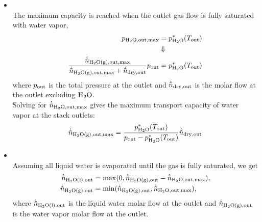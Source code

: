 \begin{itemize}
   \item {}\\
       The maximum capacity is reached when the outlet gas flow is fully saturated with water vapor, \ie
        \begin{align}
         p_{\mathrm{H_2O,out,max}}&=p_{\mathrm{H_2O}}^{\mathrm{\ast}}(T_{\mathrm{out}})\\
          &\Downarrow \quad \nonumber\\
         \frac{\dot{\tilde n}_{\mathrm{H_2O(g),out,max}}}{\dot{\tilde n}_{\mathrm{H_2O(g),out,max}}+\dot{\tilde n}_{\mathrm{dry,out}}} p_{\mathrm{out}}&=p_{\mathrm{H_2O}}^{\mathrm{\ast}}(T_{\mathrm{out}})         
        \end{align}
       where $p_{\mathrm{out}}$ is the total pressure at the outlet and $\dot{\tilde n}_{\mathrm{dry,out}}$ is the molar flow at the outlet excluding $\mathrm{H_2O}$.\\
       Solving for $\dot{\tilde n}_{\mathrm{H_2O,out,max}}$ gives the maximum transport capacity of water vapor at the stack outlets:
        \begin{align}
         \dot{\tilde n}_{\mathrm{H_2O(g),out,max}} = \frac{p_{\mathrm{H_2O}}^{\mathrm{\ast}}(T_{\mathrm{out}})}{p_{\mathrm{out}}-p_{\mathrm{H_2O}}^{\mathrm{\ast}}(T_{\mathrm{out}})} \dot{\tilde n}_{\mathrm{dry,out}}   
        \end{align}
   \item {}\\
       Assuming all liquid water is evaporated until the gas is fully saturated, we get
        \begin{align}
         \dot{\tilde n}_{\mathrm{H_2O(l),out}} &= \max(0,\dot{\tilde n}_{\mathrm{H_2O(g),out}}-\dot{\tilde n}_{\mathrm{H_2O,out,max}}),\\
         \dot{\tilde n}_{\mathrm{H_2O(g),out}} &= \min(\dot{\tilde n}_{\mathrm{H_2O(g),out}},\dot{\tilde n}_{\mathrm{H_2O,out,max}}),
        \end{align}
       where $\dot{\tilde n}_{\mathrm{H_2O(l),out}}$ is the liquid water molar flow at the outlet and  $\dot{\tilde n}_{\mathrm{H_2O(g),out}}$ is the water vapor molar flow at the outlet.
\end{itemize}
%
%
